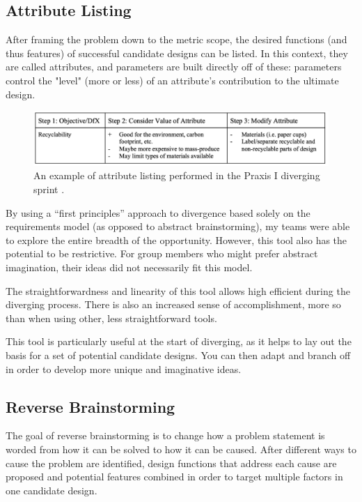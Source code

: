 \documentclass{report}
\begin{document}
\subsection{Attribute Listing}

After framing the problem down to the metric scope, the desired functions (and thus features)
of successful candidate designs can be listed. In this context, they are called attributes, and
parameters are built directly off of these: parameters control the "level" (more or less) of an attribute's
contribution to the ultimate design.

\begin{figure}[h]
    \centering
    \includegraphics[width=\textwidth/2]{images/attributelisting.png}
    \hfill
    \caption{An example of attribute listing performed in the Praxis I diverging sprint \cite{candidatestools}.}
\end{figure}

By using a “first principles” approach to divergence based solely on the requirements model (as opposed 
to abstract brainstorming), my teams were able to explore the entire breadth of the opportunity. However, 
this tool also has the potential to be restrictive. For group members who might prefer abstract imagination, their 
ideas did not necessarily fit this model.

The straightforwardness and linearity of this tool allows high efficient during the 
diverging process. There is also an increased sense of accomplishment, more so than when using 
other, less straightforward tools.

This tool is particularly useful at the start of diverging, as it helps to lay out the basis 
for a set of potential candidate designs. You can then adapt and branch off in order to develop 
more unique and imaginative ideas.

\subsection{Reverse Brainstorming}

The goal of reverse brainstorming is to change how a problem statement is worded from how it can be 
solved to how it can be caused. After different ways to cause the problem are identified, design 
functions that address each cause are proposed and potential features combined in order to target multiple factors 
in one candidate design.
\end{document}
